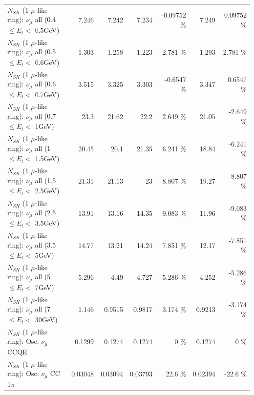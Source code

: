 \begin{table}
\begin{tabular}{| l | r | r | r  r | r  r |}
       $N_{SK}$ (1 $\mu$-like ring): $\nu_{\mu}$ all (0.4 $\leq E_{t} <$ 0.5GeV) &           7.246 &           7.242 &           7.234 & -0.09752 \%  &           7.249 &  0.09752 \%  \\ 
       $N_{SK}$ (1 $\mu$-like ring): $\nu_{\mu}$ all (0.5 $\leq E_{t} <$ 0.6GeV) &           1.303 &           1.258 &           1.223 &   -2.781 \%  &           1.293 &    2.781 \%  \\ 
       $N_{SK}$ (1 $\mu$-like ring): $\nu_{\mu}$ all (0.6 $\leq E_{t} <$ 0.7GeV) &           3.515 &           3.325 &           3.303 &  -0.6547 \%  &           3.347 &   0.6547 \%  \\ 
         $N_{SK}$ (1 $\mu$-like ring): $\nu_{\mu}$ all (0.7 $\leq E_{t} <$ 1GeV) &            23.3 &           21.62 &            22.2 &    2.649 \%  &           21.05 &   -2.649 \%  \\ 
         $N_{SK}$ (1 $\mu$-like ring): $\nu_{\mu}$ all (1 $\leq E_{t} <$ 1.5GeV) &           20.45 &            20.1 &           21.35 &    6.241 \%  &           18.84 &   -6.241 \%  \\ 
       $N_{SK}$ (1 $\mu$-like ring): $\nu_{\mu}$ all (1.5 $\leq E_{t} <$ 2.5GeV) &           21.31 &           21.13 &              23 &    8.807 \%  &           19.27 &   -8.807 \%  \\ 
       $N_{SK}$ (1 $\mu$-like ring): $\nu_{\mu}$ all (2.5 $\leq E_{t} <$ 3.5GeV) &           13.91 &           13.16 &           14.35 &    9.083 \%  &           11.96 &   -9.083 \%  \\ 
         $N_{SK}$ (1 $\mu$-like ring): $\nu_{\mu}$ all (3.5 $\leq E_{t} <$ 5GeV) &           14.77 &           13.21 &           14.24 &    7.851 \%  &           12.17 &   -7.851 \%  \\ 
           $N_{SK}$ (1 $\mu$-like ring): $\nu_{\mu}$ all (5 $\leq E_{t} <$ 7GeV) &           5.296 &            4.49 &           4.727 &    5.286 \%  &           4.252 &   -5.286 \%  \\ 
          $N_{SK}$ (1 $\mu$-like ring): $\nu_{\mu}$ all (7 $\leq E_{t} <$ 30GeV) &           1.146 &          0.9515 &          0.9817 &    3.174 \%  &          0.9213 &   -3.174 \%  \\ 
\hline
\hline
                               $N_{SK}$ (1 $\mu$-like ring): Osc. $\nu_\mu$ CCQE &          0.1299 &          0.1274 &          0.1274 &        0 \%  &          0.1274 &        0 \%  \\ 
                          $N_{SK}$ (1 $\mu$-like ring): Osc. $\nu_\mu$ CC 1$\pi$ &         0.03048 &         0.03094 &         0.03793 &     22.6 \%  &         0.02394 &    -22.6 \%  \\ 

\end{tabular}
\end{table}
